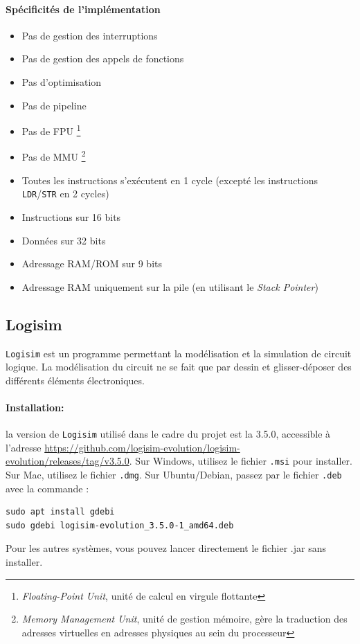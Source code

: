 \documentclass{article}
\begin{document}
    \paragraph{Spécificités de l'implémentation}
    \begin{itemize}
        \item Pas de gestion des interruptions
        \item Pas de gestion des appels de fonctions
        \item Pas d'optimisation
        \item Pas de pipeline
        \item Pas de FPU \footnote{\textit{Floating-Point Unit}, unité de calcul en virgule flottante}
        \item Pas de MMU \footnote{\textit{Memory Management Unit}, unité de gestion mémoire, gère la traduction des adresses virtuelles en adresses physiques au sein du processeur}
        \item Toutes les instructions s'exécutent en 1 cycle (excepté les instructions \texttt{LDR}/\texttt{STR} en 2 cycles)
        \item Instructions sur 16 bits
        \item Données sur 32 bits
        \item Adressage RAM/ROM sur 9 bits
        \item Adressage RAM uniquement sur la pile (en utilisant le \textit{Stack Pointer})
    \end{itemize}

    \subsection{Logisim}

    \texttt{Logisim} est un programme permettant la modélisation et la simulation de circuit logique.
    La modélisation du circuit ne se fait que par dessin et glisser-déposer des différents éléments électroniques.

    \paragraph{Installation:} la version de \texttt{Logisim} utilisé dans le cadre du projet est la 3.5.0, accessible à l'adresse \url{https://github.com/logisim-evolution/logisim-evolution/releases/tag/v3.5.0}.
    Sur Windows, utilisez le fichier \texttt{.msi} pour installer.
    Sur Mac, utilisez le fichier \texttt{.dmg}.
    Sur Ubuntu/Debian, passez par le fichier \texttt{.deb} avec la commande :
    \begin{lstlisting}
sudo apt install gdebi
sudo gdebi logisim-evolution_3.5.0-1_amd64.deb
    \end{lstlisting}
    Pour les autres systèmes, vous pouvez lancer directement le fichier .jar sans installer.
\end{document}
